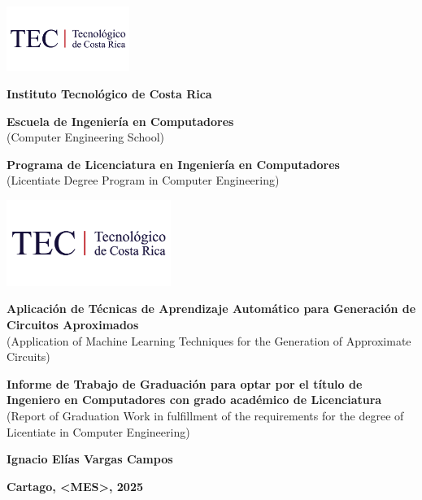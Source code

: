 \begin{titlepage}
    \raggedright
    \addtolength{\topmargin}{-1cm}
    \includegraphics[width = 40mm]{imágenes/logo tec.png}

    \begin{center}
        \vspace*{1cm}

        {\large\textbf{Instituto Tecnológico de Costa Rica}}

        \vspace{0.3cm}

        {\large\textbf{Escuela de Ingeniería en Computadores}}\\
        {\small{(Computer Engineering School)}}

        \vspace{0.3cm}

        {\large\textbf{Programa de Licenciatura en Ingeniería en Computadores}}\\
        {\small{(Licentiate Degree Program in Computer Engineering)}}

        \vspace{0.5cm}

        \includegraphics[width=0.4\textwidth]{imágenes/logo tec.png}
        \vspace{1cm}

        {\large\textbf{Aplicación de Técnicas de Aprendizaje Automático para Generación de Circuitos Aproximados
        }}\\
        {\small{(Application of Machine Learning Techniques for the Generation of Approximate Circuits)}}

        \vspace{2cm}

        {\large\textbf{Informe de Trabajo de Graduación para optar por el título de Ingeniero en Computadores con grado académico de Licenciatura}}\\
        {\small{(Report of Graduation Work in fulfillment of the requirements for the degree of Licentiate in Computer Engineering)}}

        \vspace{3cm}

        {\large\textbf{Ignacio Elías Vargas Campos}}

        \vfill

        {\large\textbf{
        Cartago, <MES>, 2025
        }}
    \end{center}
\end{titlepage}
